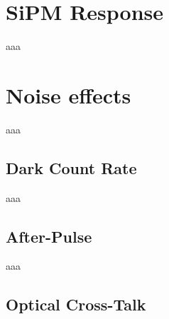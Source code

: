 \section{SiPM Response}
aaa

\section{Noise effects}
aaa

\subsection{Dark Count Rate}
aaa

\subsection{After-Pulse}
aaa

\subsection{Optical Cross-Talk}
